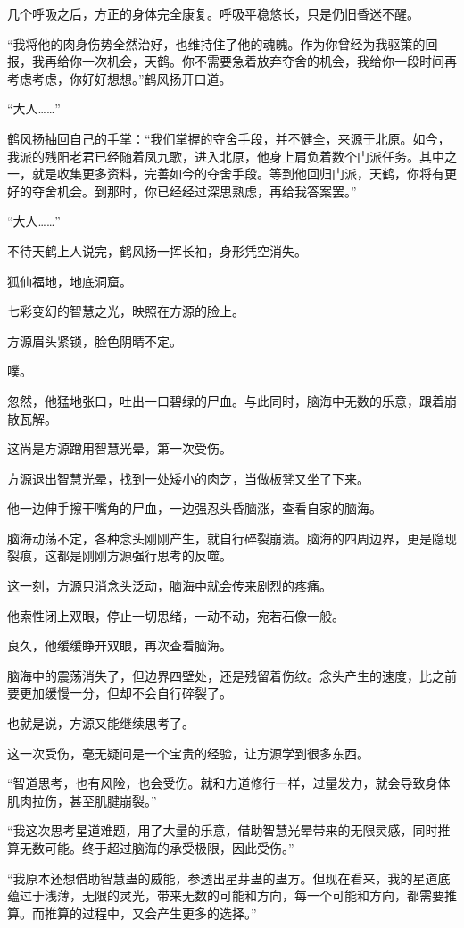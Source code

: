 \begin{this_body}
几个呼吸之后，方正的身体完全康复。呼吸平稳悠长，只是仍旧昏迷不醒。

“我将他的肉身伤势全然治好，也维持住了他的魂魄。作为你曾经为我驱策的回报，我再给你一次机会，天鹤。你不需要急着放弃夺舍的机会，我给你一段时间再考虑考虑，你好好想想。”鹤风扬开口道。

“大人……”

鹤风扬抽回自己的手掌：“我们掌握的夺舍手段，并不健全，来源于北原。如今，我派的残阳老君已经随着凤九歌，进入北原，他身上肩负着数个门派任务。其中之一，就是收集更多资料，完善如今的夺舍手段。等到他回归门派，天鹤，你将有更好的夺舍机会。到那时，你已经经过深思熟虑，再给我答案罢。”

“大人……”

不待天鹤上人说完，鹤风扬一挥长袖，身形凭空消失。

狐仙福地，地底洞窟。

七彩变幻的智慧之光，映照在方源的脸上。

方源眉头紧锁，脸色阴晴不定。

噗。

忽然，他猛地张口，吐出一口碧绿的尸血。与此同时，脑海中无数的乐意，跟着崩散瓦解。

这尚是方源蹭用智慧光晕，第一次受伤。

方源退出智慧光晕，找到一处矮小的肉芝，当做板凳又坐了下来。

他一边伸手擦干嘴角的尸血，一边强忍头昏脑涨，查看自家的脑海。

脑海动荡不定，各种念头刚刚产生，就自行碎裂崩溃。脑海的四周边界，更是隐现裂痕，这都是刚刚方源强行思考的反噬。

这一刻，方源只消念头泛动，脑海中就会传来剧烈的疼痛。

他索性闭上双眼，停止一切思绪，一动不动，宛若石像一般。

良久，他缓缓睁开双眼，再次查看脑海。

脑海中的震荡消失了，但边界四壁处，还是残留着伤纹。念头产生的速度，比之前要更加缓慢一分，但却不会自行碎裂了。

也就是说，方源又能继续思考了。

这一次受伤，毫无疑问是一个宝贵的经验，让方源学到很多东西。

“智道思考，也有风险，也会受伤。就和力道修行一样，过量发力，就会导致身体肌肉拉伤，甚至肌腱崩裂。”

“我这次思考星道难题，用了大量的乐意，借助智慧光晕带来的无限灵感，同时推算无数可能。终于超过脑海的承受极限，因此受伤。”

“我原本还想借助智慧蛊的威能，参透出星芽蛊的蛊方。但现在看来，我的星道底蕴过于浅薄，无限的灵光，带来无数的可能和方向，每一个可能和方向，都需要推算。而推算的过程中，又会产生更多的选择。”


\end{this_body}
